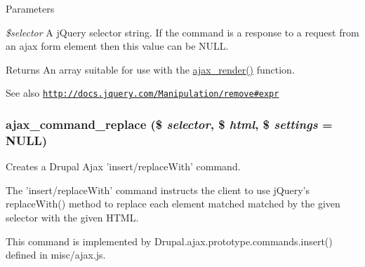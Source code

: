 \begin{DoxyParams}{Parameters}
\item[{\em \$selector}]A jQuery selector string. If the command is a response to a request from an ajax form element then this value can be NULL.\end{DoxyParams}
\begin{DoxyReturn}{Returns}
An array suitable for use with the \hyperlink{group__ajax_ga241c2426bdde049c55b05b7bf5d714a2}{ajax\_\-render()} function.
\end{DoxyReturn}
\begin{DoxySeeAlso}{See also}
\href{http://docs.jquery.com/Manipulation/remove#expr}{\tt http://docs.jquery.com/Manipulation/remove\#expr} 
\end{DoxySeeAlso}
\hypertarget{group__ajax__commands_ga558989ae457ca293bfb8ea19070ed334}{
\subsubsection[{ajax\_\-command\_\-replace}]{\setlength{\rightskip}{0pt plus 5cm}ajax\_\-command\_\-replace (\$ {\em selector}, \/  \$ {\em html}, \/  \$ {\em settings} = {\ttfamily NULL})}}
\label{group__ajax__commands_ga558989ae457ca293bfb8ea19070ed334}
Creates a Drupal Ajax 'insert/replaceWith' command.

The 'insert/replaceWith' command instructs the client to use jQuery's replaceWith() method to replace each element matched matched by the given selector with the given HTML.

This command is implemented by Drupal.ajax.prototype.commands.insert() defined in misc/ajax.js.


